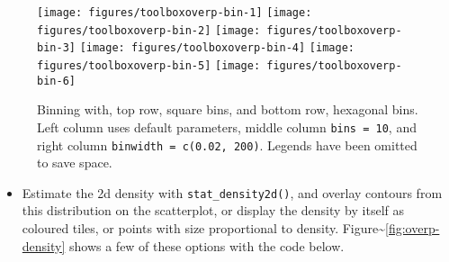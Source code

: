 \begin{figure}
\texttt{[image: figures/toolboxoverp-bin-1]} \texttt{[image: figures/toolboxoverp-bin-2]} \texttt{[image: figures/toolboxoverp-bin-3]} \texttt{[image: figures/toolboxoverp-bin-4]} \texttt{[image: figures/toolboxoverp-bin-5]} \texttt{[image: figures/toolboxoverp-bin-6]} \caption{Binning with, top row, square bins, and bottom row, hexagonal bins. Left column uses default parameters, middle column \texttt{bins = 10}, and right column \texttt{binwidth = c(0.02, 200)}. Legends have been omitted to save space.\label{fig:overp-bin}}
\end{figure}

\begin{itemize}
\itemsep1pt\parskip0pt
\item
  Estimate the 2d density with \texttt{stat\_density2d()}, and overlay
  contours from this distribution on the scatterplot, or display the
  density by itself as coloured tiles, or points with size proportional
  to density. Figure\textasciitilde{}\ref{fig:overp-density} shows a few
  of these options with the code below.
   
\end{itemize}

\begin{Shaded}
\begin{Highlighting}[]
\StringTok{ }\StringTok{ }\NormalTok{(}\NormalTok{,}\NormalTok{) +}\StringTok{ }
\StringTok{  }\NormalTok{(} \NormalTok{)}
\StringTok{ }\NormalTok{() +}\StringTok{ }\NormalTok{()}
\StringTok{ }\NormalTok{(} \NormalTok{, }\NormalTok{(} 
                    \StringTok{ }\NormalTok{(} \NormalTok{(}\NormalTok{, }\NormalTok{))}
\StringTok{ }\NormalTok{(} \NormalTok{, }\NormalTok{(} 
                    
\NormalTok{() +}\StringTok{ }\NormalTok{(} \NormalTok{(}\NormalTok{,}\NormalTok{))}
\end{Highlighting}
\end{Shaded}

